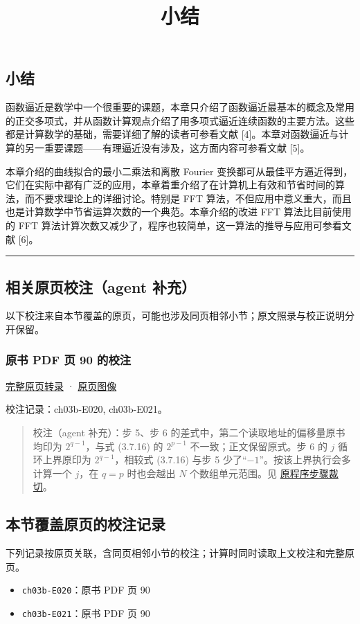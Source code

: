 \documentclass[
  10pt,
  fontset=fandol]{ctexart}
\title{小结}
\author{}
\date{}
\providecommand{\tightlist}{%
  \setlength{\itemsep}{0pt}\setlength{\parskip}{0pt}}
\begin{document}
\maketitle

\subsection{小结}\label{ux5c0fux7ed3}

函数逼近是数学中一个很重要的课题，本章只介绍了函数逼近最基本的概念及常用的正交多项式，并从函数计算观点介绍了用多项式逼近连续函数的主要方法。这些都是计算数学的基础，需要详细了解的读者可参看文献 {[}4{]}。本章对函数逼近与计算的另一重要课题------有理逼近没有涉及，这方面内容可参看文献 {[}5{]}。

本章介绍的曲线拟合的最小二乘法和离散 Fourier 变换都可从最佳平方逼近得到，它们在实际中都有广泛的应用，本章着重介绍了在计算机上有效和节省时间的算法，而不要求理论上的详细讨论。特别是 FFT 算法，不但应用中意义重大，而且也是计算数学中节省运算次数的一个典范。本章介绍的改进 FFT 算法比目前使用的 FFT 算法计算次数又减少了，程序也较简单，这一算法的推导与应用可参看文献 {[}6{]}。

\begin{center}\rule{0.5\linewidth}{0.5pt}\end{center}

\subsection{相关原页校注（agent 补充）}\label{ux76f8ux5173ux539fux9875ux6821ux6ce8agent-ux8865ux5145}

以下校注来自本节覆盖的原页，可能也涉及同页相邻小节；原文照录与校正说明分开保留。

\subsubsection{原书 PDF 页 90 的校注}\label{ux539fux4e66-pdf-ux9875-90-ux7684ux6821ux6ce8}

\href{../pages/pdf-090.md}{完整原页转录} · \href{../../source-images/pdf-090.jpeg}{原页图像}

校注记录：ch03b-E020, ch03b-E021。

\begin{quote}
校注（agent 补充）：步 5、步 6 的差式中，第二个读取地址的偏移量原书均印为 \(2^{q-1}\)，与式 (3.7.16) 的 \(2^{p-1}\) 不一致；正文保留原式。步 6 的 \(j\) 循环上界原印为 \(2^{q-1}\)，相较式 (3.7.16) 与步 5 少了``\(-1\)''。按该上界执行会多计算一个 \(j\)，在 \(q=p\) 时也会越出 \(N\) 个数组单元范围。见 \href{../assets/ch03b/p090-fft-steps.png}{原程序步骤裁切}。
\end{quote}

\subsection{本节覆盖原页的校注记录}\label{ux672cux8282ux8986ux76d6ux539fux9875ux7684ux6821ux6ce8ux8bb0ux5f55}

下列记录按原页关联，含同页相邻小节的校注；计算时同时读取上文校注和完整原页。

\begin{itemize}
\tightlist
\item
  \texttt{ch03b-E020}：原书 PDF 页 90
\item
  \texttt{ch03b-E021}：原书 PDF 页 90
\end{itemize}
\end{document}
